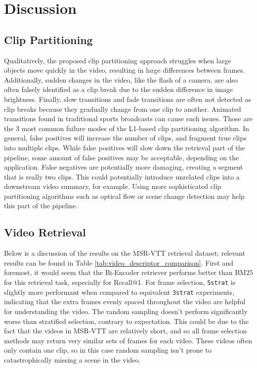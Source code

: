 \section{Discussion}

\subsection{Clip Partitioning}

Qualitatively, the proposed clip partitioning approach struggles when large objects move quickly in the video, resulting in large differences between frames.
Additionally, sudden changes in the video, like the flash of a camera, are also often falsely identified as a clip break due to the sudden difference in image brightness.
Finally, slow transitions and fade transitions are often not detected as clip breaks because they gradually change from one clip to another.
Animated transitions found in traditional sports broadcasts can cause such issues.
Those are the 3 most common failure modes of the L1-based clip partitioning algorithm.
In general, false positives will increase the number of clips, and fragment true clips into multiple clips.
While false positives will slow down the retrieval part of the pipeline, some amount of false positives may be acceptable, depending on the application.
False negatives are potentially more damaging, creating a segment that is really two clips.
This could potentially introduce unrelated clips into a downstream video summary, for example.
Using more sophisticated clip partitioning algorithms such as optical flow or scene change detection may help this part of the pipeline.

\subsection{Video Retrieval}
Below is a discussion of the results on the MSR-VTT retrieval dataset; relevant results can be found in Table \ref{tab:video_descriptor_comparison}.
First and foremost, it would seem that the Bi-Encoder retriever performs better than BM25 for this retrieval task, especially for Recall@1.
For frame selection, \verb|5strat| is slightly more performant when compared to equivalent \verb|3strat| experiments, indicating that the extra frames evenly spaced throughout the video are helpful for understanding the video.
The random sampling doesn't perform significantly worse than stratified selection, contrary to expectation. 
This could be due to the fact that the videos in MSR-VTT are relatively short, and so all frame selection methods may return very similar sets of frames for each video.
These videos often only contain one clip, so in this case random sampling isn't prone to catastrophically missing a scene in the video.

